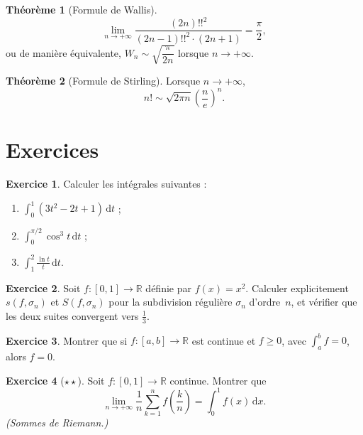 \documentclass[12pt,a4paper,openany]{book}
\theoremstyle{definition}
\newtheorem{theoreme}{Théorème}[chapter]
\newtheorem{exercice}{Exercice}[chapter]
\newcommand{\R}{\mathbb{R}}
\newcommand{\dd}{\mathrm{d}}
\begin{document}
\begin{theoreme}[Formule de Wallis]\label{thm:wallis}
  \[
    \lim_{n \to +\infty} \frac{(2n)!!^2}{(2n-1)!!^2 \cdot (2n+1)} = \frac{\pi}{2},
  \]
  ou de manière équivalente, $W_n \sim \sqrt{\dfrac{\pi}{2n}}$ lorsque $n \to +\infty$.
\end{theoreme}

\begin{theoreme}[Formule de Stirling]\label{thm:stirling}
  Lorsque $n \to +\infty$,
  \[
    n! \sim \sqrt{2\pi n}\left(\frac{n}{e}\right)^n.
  \]
\end{theoreme}

\section{Exercices}
\label{sec:exercices-chap7}

\begin{exercice}
  Calculer les intégrales suivantes :
  \begin{enumerate}[label=(\alph*)]
    \item $\displaystyle\int_0^1 (3t^2 - 2t + 1)\,\dd t$ ;
    \item $\displaystyle\int_0^{\pi/2} \cos^3 t\,\dd t$ ;
    \item $\displaystyle\int_1^2 \frac{\ln t}{t}\,\dd t$.
  \end{enumerate}
\end{exercice}

\begin{exercice}
  Soit $f \colon [0,1] \to \R$ définie par $f(x) = x^2$. Calculer explicitement $s(f, \sigma_n)$ et $S(f, \sigma_n)$ pour la subdivision régulière $\sigma_n$ d'ordre~$n$, et vérifier que les deux suites convergent vers $\frac{1}{3}$.
\end{exercice}

\begin{exercice}
  Montrer que si $f \colon [a,b] \to \R$ est continue et $f \geqslant 0$, avec $\displaystyle\int_a^b f = 0$, alors $f = 0$.
\end{exercice}

\begin{exercice}[$\star\star$]
  Soit $f \colon [0,1] \to \R$ continue. Montrer que
  \[
    \lim_{n \to +\infty} \frac{1}{n}\sum_{k=1}^{n} f\!\left(\frac{k}{n}\right) = \int_0^1 f(x)\,\dd x.
  \]
  \emph{(Sommes de Riemann.)}
\end{exercice}
\end{document}
